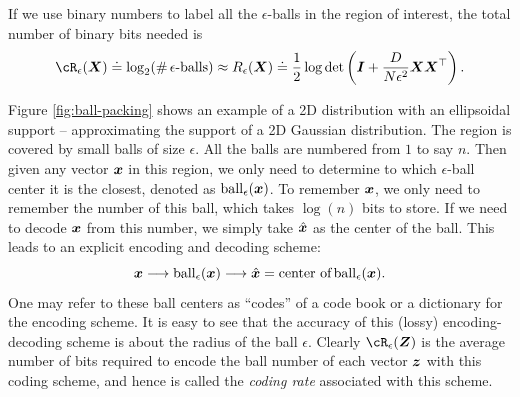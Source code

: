 \documentclass[../../book-main.tex]{subfiles}
\begin{document}
If we use binary numbers to label all the $\epsilon$-balls in the region of interest, the total number of binary bits needed is %
\begin{equation} 
	\cR_{\epsilon}(\X) \doteq \log_2 (\# \,\epsilon\mbox{-balls}) \approx R_{\epsilon}(\X) \doteq \frac{1}{2} \log \det \left(\boldsymbol{I} + \frac{D}{N\epsilon^2} \X\X^\top \right).
	\label{eqn:rate-Gaussian}
\end{equation}

\begin{example}
	Figure \ref{fig:ball-packing} shows an example of a 2D distribution with an ellipsoidal support -- approximating the support of a 2D Gaussian distribution. The region is covered by small balls of size $\epsilon$. All the balls are numbered from $1$ to say $n$. Then given any vector $\bm{x}$ in this region, we
	only need to determine to which $\epsilon$-ball center it is the closest, denoted as $\operatorname{ball}_{\epsilon}(\bm{x})$. To remember $\bm{x}$, we only need to remember the number of this ball, which takes $\log(n)$ bits to store. If we need to decode $\bm{x}$ from this number, we simply take $\hat {\bm{x}}$ as the center of the ball. This leads to an explicit encoding and decoding scheme:
	\begin{equation}
		\bm{x} \longrightarrow \operatorname{ball}_{\epsilon}(\bm{x}) \longrightarrow \hat {\bm{x}} = \mbox{center of} \operatorname{ball}_{\epsilon}(\bm{x}).
	\end{equation}
	One may refer to these ball centers as  ``codes'' of a code book or a dictionary for the encoding scheme. It is easy to see that the accuracy of this (lossy) encoding-decoding scheme is about the radius of the ball $\epsilon$. Clearly $\cR_{\epsilon}(\Z)$ is the average number of bits required to encode the ball number of each vector $\bm{z}$ with this coding scheme, and hence is called the {\em coding rate} associated with this scheme.
\end{example}
\end{document}
